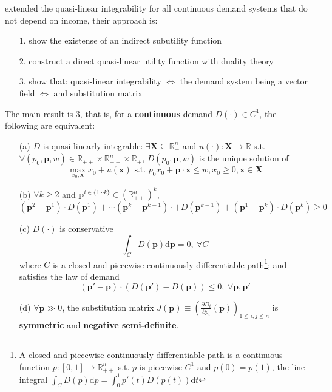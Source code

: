 \citet*{nocke2017quasi} extended the quasi-linear integrability for all continuous demand systems that do not depend on income, their approach is:
\begin{enumerate}
    \item[1.] show the existense of an indirect subutility function
    \item[2.] construct a direct quasi-linear utility function with duality theory
    \item[3.] show that: quasi-linear integrability $\Leftrightarrow$ the demand system being a  vector field $\Leftrightarrow$   and  substitution matrix
\end{enumerate}

The main result is 3, that is, for a \textbf{continuous} demand $D(\cdot)\in C^1$, the following are equivalent:
\begin{enumerate}
    \item[(a)] $D$ is quasi-linearly integrable: $\exists \mathbf{X}\subseteq \mathbb{R}^n_+$ and $u(\cdot):\mathbf{X}\rightarrow \mathbb{R}$ s.t. $\forall (p_0,\mathbf{p},w)\in\mathbb{R}_{++}\times \mathbb{R}^n_{++}\times \mathbb{R}_+$, $D(p_0,\mathbf{p},w)$ is the unique solution of 
    $$\max_{x_0,\mathbf{x}}x_0+u(\mathbf{x}) \text{ s.t. } p_0x_0+\mathbf{p}\cdot\mathbf{x}\leq w, x_0\geq 0,\mathbf{x}\in \mathbf{X}
    $$
    \item[(b)] $\forall k\geq 2$ and $\mathbf{p}^{i\in \{1\cdots k\}}\in \left(\mathbb{R}^n_{++}\right)^k$, $$ \left(\mathbf{p}^2-\mathbf{p}^1\right)\cdot D\left(\mathbf{p}^1\right) +\cdots \left(\mathbf{p}^k-\mathbf{p}^{k-1}\right)\cdot + D\left(\mathbf{p}^{k-1}\right) + \left(\mathbf{p}^1-\mathbf{p}^k\right)\cdot D\left(\mathbf{p}^k\right)\geq 0 $$
    \item[(c)] $D(\cdot)$ is conservative $$ \int_C D(\mathbf{p})\mathrm{d}\mathbf{p}=0,\ \forall C$$ where $C$ is a closed and piecewise-continuously differentiable path\footnote{A closed and piecewise-continuously differentiable path is a continuous function $p:[0,1]\rightarrow \mathbb{R}^n_{++}$ s.t. $p$ is piecewise $C^1$ and $p(0)=p(1)$, the line integral $\int_C D(p)\mathrm{d}p=\int^1_0 p'(t)D(p(t))\mathrm{d}t$}; and satisfies the law of demand $$ (\mathbf{p}'-\mathbf{p})\cdot (D(\mathbf{p}')-D(\mathbf{p}))\leq 0, \ \forall \mathbf{p},\mathbf{p}' $$
    \item[(d)] $\forall \mathbf{p}\gg 0$, the substitution matrix $J(\mathbf{p})\equiv \left(\frac{\partial D_i}{\partial p_i}(\mathbf{p})\right)_{1\leq i,j\leq n}$ is \textbf{symmetric} and \textbf{negative semi-definite}.
\end{enumerate}

